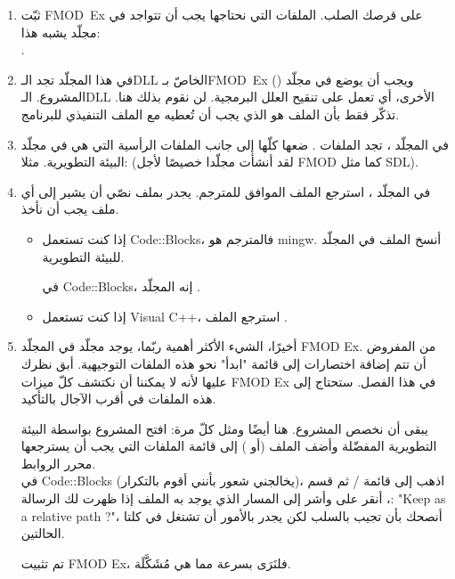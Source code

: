 \begin{enumerate}
	\item ثبّت
	\mbox{\textenglish{FMOD Ex}}
على قرصك الصلب. الملفات التي نحتاجها يجب أن تتواجد في مجلّد يشبه هذا:\\
	.
	\item في هذا المجلّد تجد الـ\textenglish{DLL}
	الخاصّ بـ\mbox{\textenglish{FMOD Ex}}
	()
	ويجب أن يوضع في مجلّد المشروع. الـ\textenglish{DLL}
	الأخرى، أي
	تعمل على تنقيح العلل البرمجية. لن نقوم بذلك هنا. تذكّر فقط بأن الملف
	هو الذي يجب أن تُعطيه مع الملف التنفيذي للبرنامج.
	\item في المجلّد
	،
	تجد الملفات
	.
	ضعها كلّها إلى جانب الملفات الرأسية التي هي في مجلّد البيئة التطويرية. مثلا:
	(لقد أنشأت مجلّدا خصيصًا لأجل
	\textenglish{FMOD}
	كما مثل \textenglish{SDL}).
	\item في المجلّد
	،
	استرجع الملف الموافق للمترجم. يجدر بملف نصّي أن يشير إلى أي ملف يجب أن نأخذ.
	\begin{itemize}
		\item إذا كنت تستعمل
		\textenglish{Code::Blocks}،
		فالمترجم هو
		\textenglish{mingw}.
		أنسخ الملف
		في المجلّد
		للبيئة التطويرية.
		
		في
		\textenglish{Code::Blocks}،
		إنه المجلّد
		.
		\item إذا كنت تستعمل
		\textenglish{Visual C++}،
		استرجع الملف
		.
	\end{itemize}
	\item أخيرًا، الشيء الأكثر أهمية ربّما، يوجد مجلّد 
	في المجلّد
	\textenglish{FMOD Ex}.
	من المفروض أن تتم إضافة اختصارات إلى قائمة "ابدأ" نحو هذه الملفات التوجيهية. أبق نظرك عليها لأنه لا يمكننا أن نكتشف كلّ ميزات
	\textenglish{FMOD Ex}
	في هذا الفصل. ستحتاج إلى هذه الملفات في أقرب الآجال بالتأكيد.
	
	يبقى أن نخصص المشروع. هنا أيضًا ومثل كلّ مرة: افتح المشروع بواسطة البيئة التطويرية المفضّلة وأضف الملف
	(أو
	)
	إلى قائمة الملفات التي يجب أن يسترجعها محرر الروابط.\\
	في
	\textenglish{Code::Blocks}
	(يخالجني شعور بأنني أقوم بالتكرار)، اذهب إلى قائمة
	 / 
	ثم قسم
	،
	أنقر على
	وأشر إلى المسار الذي يوجد به الملف
	إذا ظهرت لك الرسالة:
	"\textenglish{Keep as a relative path ?}"،
	أنصحك بأن تجيب بالسلب لكن يجدر بالأمور أن تشتغل في كلتا الحالتين.
	
	تم تثبيت
	\textenglish{FMOD Ex}،
	فلنَرَى بسرعة مما هي مُشَكَّلَة.
\end{enumerate}

